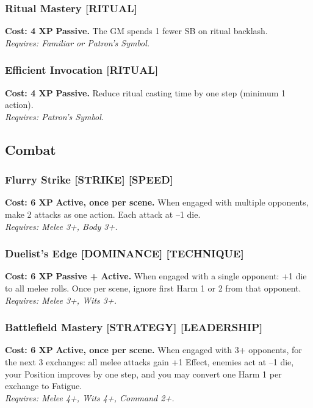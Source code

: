 \subsubsection*{Ritual Mastery \textnormal{[RITUAL]}}
\label{talent:ritual-mastery}
\textbf{Cost: 4 XP} \textbf{Passive.} The GM spends 1 fewer SB on ritual backlash. \\
\textit{Requires: Familiar or Patron’s Symbol.}

\subsubsection*{Efficient Invocation \textnormal{[RITUAL]}}
\label{talent:efficient-invocation}
\textbf{Cost: 4 XP} \textbf{Passive.} Reduce ritual casting time by one step (minimum 1 action). \\
\textit{Requires: Patron’s Symbol.}

\subsection*{Combat}
\label{sec:major-combat}

\subsubsection*{Flurry Strike \textnormal{[STRIKE] [SPEED]}}
\label{talent:flurry-strike}
\textbf{Cost: 6 XP} \textbf{Active, once per scene.} When engaged with multiple opponents, make 2 attacks as one action. Each attack at –1 die. \\
\textit{Requires: Melee 3+, Body 3+.}

\subsubsection*{Duelist's Edge \textnormal{[DOMINANCE] [TECHNIQUE]}}
\label{talent:duelists-edge}
\textbf{Cost: 6 XP} \textbf{Passive + Active.} When engaged with a single opponent: +1 die to all melee rolls. Once per scene, ignore first Harm 1 or 2 from that opponent. \\
\textit{Requires: Melee 3+, Wits 3+.}

\subsubsection*{Battlefield Mastery \textnormal{[STRATEGY] [LEADERSHIP]}}
\label{talent:battlefield-mastery}
\textbf{Cost: 6 XP} \textbf{Active, once per scene.} When engaged with 3+ opponents, for the next 3 exchanges: all melee attacks gain +1 Effect, enemies act at –1 die, your Position improves by one step, and you may convert one Harm 1 per exchange to Fatigue. \\
\textit{Requires: Melee 4+, Wits 4+, Command 2+.}

